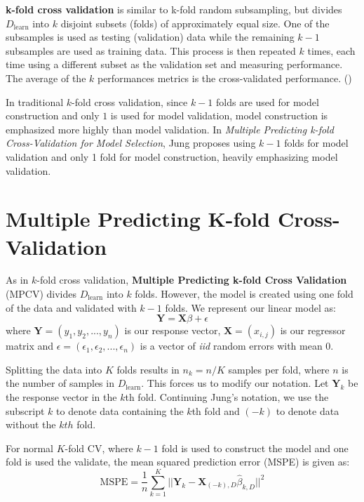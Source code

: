 \documentclass[letter]{article}
\begin{document}
\textbf{k-fold cross validation} is similar to k-fold random subsampling, but divides \(D_{\textrm{learn}}\) into \(k\) disjoint subsets (folds) of approximately equal size.  One of the subsamples is used as testing (validation) data while the remaining \(k-1\) subsamples are used as training data.  This process is then repeated \(k\) times, each time using a different subset as the validation set and measuring performance. The average of the \(k\) performances metrics is the cross-validated performance.  (\cite{Berrar_CrossValid})

In traditional \(k\)-fold cross validation, since \(k-1\) folds are used for model construction and only \(1\) is used for model validation, model construction is emphasized more highly than model validation.  In \textit{Multiple Predicting k-fold Cross-Validation for Model Selection}, Jung proposes using \(k-1\) folds for model validation and only 1 fold for model construction, heavily emphasizing model validation.  
\section{Multiple Predicting K-fold Cross-Validation}
As in \(k\)-fold cross validation, \textbf{Multiple Predicting k-fold Cross Validation} (MPCV) divides \(D_{\textrm{learn}}\) into \(k\) folds.  However, the model is created using one fold of the data and validated with \(k-1\) folds.  We represent our linear model as:
\begin{equation}
	\textbf{Y}=\textbf{X}\beta + \epsilon
\end{equation}
where \(\textbf{Y} = (y_1, y_2, ..., y_n) \) is our response vector, \(\textbf{X}=(x_{i,j})\) is our regressor matrix and \(\epsilon = (\epsilon_1, \epsilon_2, ..., \epsilon_n)\) is a vector of \textit{iid} random errors with mean 0.

Splitting the data into \(K\) folds results in \(n_k = n/K\) samples per fold, where \(n\) is the number of samples in \(D_{\textrm{learn}}\).  This forces us to modify our notation.  Let \(\textbf{Y}_k\) be the response vector in the \(k\)th fold.  Continuing Jung's notation, we use the subscript \(k\) to denote data containing the \(k\)th fold and \((-k)\) to denote data without the \(kth\) fold.

For normal \(K\)-fold CV, where \(k-1\) fold is used to construct the model and one fold is used the validate, the mean squared prediction error (MSPE) is given as:
\begin{equation}\label{eq:PE_CV}
	\textrm{MSPE} = \frac{1}{n}\sum_{k=1}^K \big|\big| \textbf{Y}_k-\textbf{X}_{(-k),D}\hat \beta_{k, D}\big|\big|^2
\end{equation}
\end{document}

